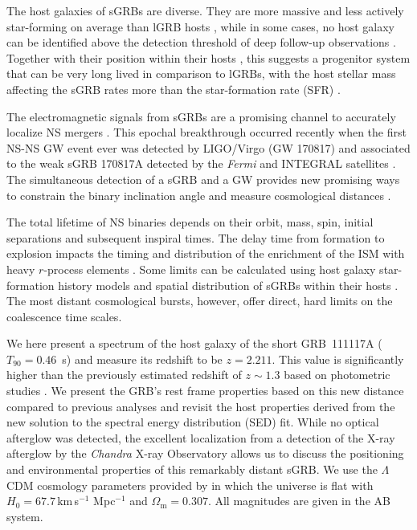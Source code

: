 \documentclass[referee]{aa}
\begin{document}
The host galaxies of sGRBs are diverse. They are more massive and less actively
star-forming on average than lGRB hosts \citep{Fong2013b}, while in some cases,
no host galaxy can be identified above the detection threshold of deep follow-up
observations \citep{Berger2010a, Tunnicliffe2014}. Together with their position
within their hosts \citep{Fong2013a}, this suggests a progenitor system that can
be very long lived in comparison to lGRBs, with the host stellar mass affecting
the sGRB rates more than the star-formation rate (SFR) \citep{Berger2014}.

The electromagnetic signals from sGRBs are a promising channel to accurately
localize NS mergers \citep{Ghirlanda2016}. This epochal breakthrough occurred
recently when the first NS-NS GW event ever was detected by LIGO/Virgo (GW
170817) and associated to the weak sGRB 170817A detected by the \textit{Fermi}
and INTEGRAL satellites \citep{LIGOScientificCollaboration2017a, Goldstein2017,
	Savchenko2017}. The simultaneous detection of a sGRB and a GW provides new
promising ways to constrain the binary inclination angle \citep{Arun2014,
	LIGOScientificCollaboration2017a} and measure cosmological distances
\citep{Nissanke2010, LIGOScientificCollaboration2017c}.

The total lifetime of NS binaries depends on their orbit, mass, spin, initial
separations and subsequent inspiral times. The delay time from formation to
explosion impacts the timing and distribution of the enrichment of the ISM with
heavy $r$-process elements \citep{VandeVoort2015, Wallner2015,  Ji2016}. Some
limits can be calculated using host galaxy star-formation history models and
spatial distribution of sGRBs within their hosts \citep[][]{Berger2014}. The
most distant cosmological bursts, however, offer direct, hard limits on the
coalescence time scales.

We here present a spectrum of the host galaxy of the short GRB~111117A
($T_{90}=0.46$~s) and measure its redshift to be $z=2.211$. This value is
significantly higher than the previously estimated redshift of $z \sim 1.3$ based on photometric
studies \citep{Margutti2012,Sakamoto2013}. We present the GRB's rest frame
properties based on this new distance compared to previous analyses and revisit
the host properties derived from the new solution to the spectral energy
distribution (SED) fit. While no optical afterglow was detected, the excellent
localization from a detection of the X-ray afterglow by the \emph{Chandra} X-ray
Observatory allows us to discuss the positioning and environmental properties of
this remarkably distant sGRB. We use the $\Lambda$CDM cosmology parameters
provided by \citet{Planck2015} in which the universe is flat with $H_0 =
67.7$\,km\,s$^{-1}$ Mpc$^{-1}$ and $\Omega_\mathrm{m} = 0.307$. All magnitudes
are given in the AB system.
\end{document}
